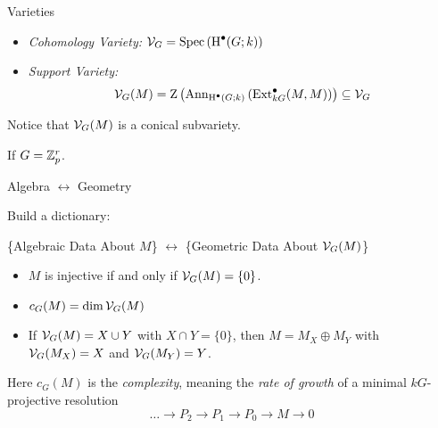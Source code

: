 \documentclass[handout]{beamer}
\begin{document}
  \begin{frame}{Varieties}
    \begin{definition}
      \begin{itemize}
        \item \emph{Cohomology Variety:} $\mathcal{V}_G = \operatorname{Spec}\left(\operatorname{H}^\bullet(G;k)\right)$
        \item \emph{Support Variety:}
          \[
            \mathcal{V}_G(M) = \operatorname{Z}\left(\operatorname{Ann}_{\operatorname{H}^\bullet(G;k)}\left(\operatorname{Ext}_{kG}^\bullet(M,M)\right)\right) \subseteq \mathcal{V}_G
          \]
        \end{itemize}
      \end{definition}
      Notice that $\mathcal{V}_G(M)$ is a conical subvariety.
      \begin{example}
        If $G = \mathbb{Z}_p^r$. 
      \end{example}
    \end{frame}

    \begin{frame}{Algebra $\leftrightarrow$ Geometry}
      \begin{idea}
        Build a dictionary:
        \begin{center}
          \{Algebraic Data About $M$\} $\leftrightarrow$ \{Geometric Data About $\mathcal{V}_G(M)$\}
        \end{center}
      \end{idea}
      \begin{theorem}
        \begin{itemize}
        \item $M$ is injective if and only if $\mathcal{V}_G(M) = \{0\}$.
        \item $c_G(M) = \dim \mathcal{V}_G(M)$
        \item If $\mathcal{V}_G(M) = X \cup Y$ with $X \cap Y = \{0\}$, then $M = M_X \oplus M_Y$ with $\mathcal{V}_G(M_X) = X$ and $\mathcal{V}_G(M_Y) = Y$.
        \end{itemize}
      \end{theorem}
      Here $c_G(M)$ is the \emph{complexity}, meaning the \emph{rate of growth} of a minimal $kG$-projective resolution
      \[
        \ldots \to P_2 \to P_1 \to P_0 \to M \to 0
      \]
    \end{frame}
\end{document}

